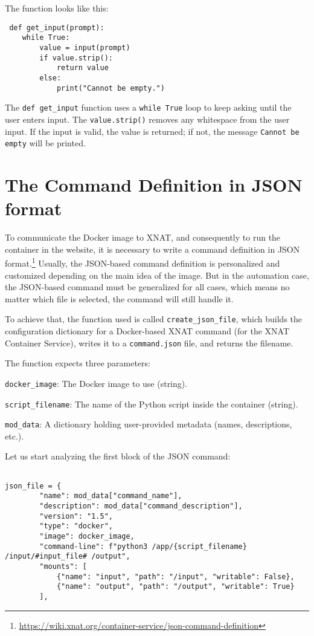 The function looks like this:
 
 \begin{lstlisting}
 def get_input(prompt):
    while True:
        value = input(prompt)
        if value.strip():
            return value
        else:
            print("Cannot be empty.")

\end{lstlisting}
The \texttt{def get\_input} function uses a \texttt{while True} loop to keep asking until the user enters input. The \texttt{value.strip()} removes any whitespace from the user input. If the input is valid, the value is returned; if not, the message \texttt{Cannot be empty} will be printed.

\section{The Command Definition in JSON format}

To communicate the Docker image to XNAT, and consequently to run the container in the website, it is necessary to write a command definition in JSON format.\footnote{\url{https://wiki.xnat.org/container-service/json-command-definition}}
Usually, the JSON-based command definition is personalized and customized depending on the main idea of the image. But in the automation case, the JSON-based command must be generalized for all cases, which means no matter which file is selected, the command will still handle it.

To achieve that, the function used is called \texttt{create\_json\_file}, which builds the configuration dictionary for a Docker-based XNAT command (for the XNAT Container Service), writes it to a \texttt{command.json} file, and returns the filename.

The function expects three parameters:

\texttt{docker\_image}: The Docker image to use (string).

\texttt{script\_filename}: The name of the Python script inside the container (string).

\texttt{mod\_data}: A dictionary holding user-provided metadata (names, descriptions, etc.).

Let us start analyzing the first block of the JSON command:
\begin{lstlisting}

json_file = {
        "name": mod_data["command_name"],
        "description": mod_data["command_description"],
        "version": "1.5",
        "type": "docker",
        "image": docker_image,
        "command-line": f"python3 /app/{script_filename} /input/#input_file# /output",
        "mounts": [
            {"name": "input", "path": "/input", "writable": False},
            {"name": "output", "path": "/output", "writable": True}
        ],
\end{lstlisting}


